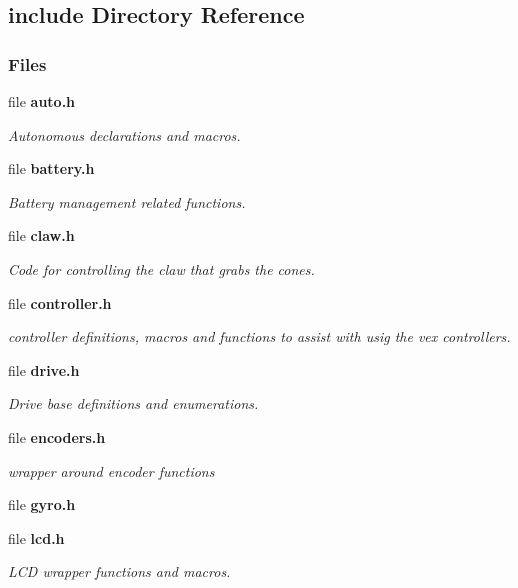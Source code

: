 \subsection{include Directory Reference}
\label{dir_d44c64559bbebec7f509842c48db8b23}
\subsubsection*{Files}
\begin{DoxyCompactItemize}
\item 
file \textbf{ auto.\+h}
\begin{DoxyCompactList}\small\item\em Autonomous declarations and macros. \end{DoxyCompactList}\item 
file \textbf{ battery.\+h}
\begin{DoxyCompactList}\small\item\em Battery management related functions. \end{DoxyCompactList}\item 
file \textbf{ claw.\+h}
\begin{DoxyCompactList}\small\item\em Code for controlling the claw that grabs the cones. \end{DoxyCompactList}\item 
file \textbf{ controller.\+h}
\begin{DoxyCompactList}\small\item\em controller definitions, macros and functions to assist with usig the vex controllers. \end{DoxyCompactList}\item 
file \textbf{ drive.\+h}
\begin{DoxyCompactList}\small\item\em Drive base definitions and enumerations. \end{DoxyCompactList}\item 
file \textbf{ encoders.\+h}
\begin{DoxyCompactList}\small\item\em wrapper around encoder functions \end{DoxyCompactList}\item 
file \textbf{ gyro.\+h}
\item 
file \textbf{ lcd.\+h}
\begin{DoxyCompactList}\small\item\em L\+CD wrapper functions and macros. \end{DoxyCompactList}\item 

\end{DoxyCompactItemize}
